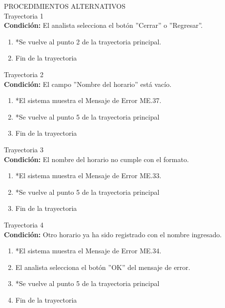 \Large{PROCEDIMIENTOS ALTERNATIVOS}\\
	\large{Trayectoria 1}\\
	\textbf{Condición:} El analista selecciona el botón ''Cerrar'' o ''Regresar''.
	\begin{enumerate}
		\item *Se vuelve al punto 2 de la trayectoria principal.
		\item Fin de la trayectoria
	\end{enumerate}
	\large{Trayectoria 2}\\
	\textbf{Condición:} El campo ''Nombre del horario'' está vacío.
	\begin{enumerate}
		\item *El sistema muestra el Mensaje de Error ME.37.
		\item *Se vuelve al punto 5 de la trayectoria principal
		\item Fin de la trayectoria
	\end{enumerate}
	\large{Trayectoria 3}\\
	\textbf{Condición:} El nombre del horario no cumple con el formato.
	\begin{enumerate}
		\item *El sistema muestra el Mensaje de Error ME.33.
		\item *Se vuelve al punto 5 de la trayectoria principal
		\item Fin de la trayectoria
	\end{enumerate}
	\large{Trayectoria 4}\\
	\textbf{Condición:} Otro horario ya ha sido registrado con el nombre ingresado.
	\begin{enumerate}
		\item *El sistema muestra el Mensaje de Error ME.34.
		\item El analista selecciona el botón ''OK'' del mensaje de error.
		\item *Se vuelve al punto 5 de la trayectoria principal
		\item Fin de la trayectoria
	\end{enumerate}
\newpage